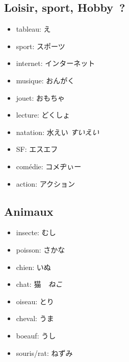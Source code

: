 \documentclass{article}
\begin{document}
\begin{CJK}{UTF8}{min}
   \subsection{Loisir, sport, Hobby~?}
        \begin{itemize}
            \item tableau: え
            \item sport: スポーツ
            \item internet: インターネット
            \item musique: おんがく
            \item jouet: おもちゃ
            \item lecture: どくしょ
            \item natation: 水えい \textit{すいえい}
            \item SF: エスエフ
            \item comédie: コメヂぃー
            \item action: アクション
        \end{itemize}
    
    \subsection{Animaux}
    \begin{itemize}
        \item insecte: むし
        \item poisson: さかな
        \item chien: いぬ
        \item chat: 猫　\textit{ねこ}
        \item oiseau: とり
        \item cheval: うま
        \item boeauf: うし
        \item souris/rat: ねずみ
    \end{itemize}


\end{CJK}
\end{document}
